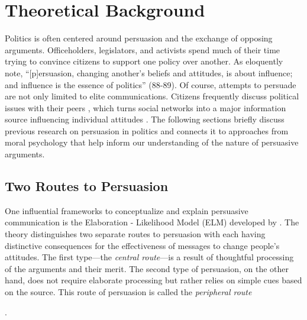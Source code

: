 


\section{Theoretical Background}

Politics is often centered around persuasion and the exchange of opposing arguments. Officeholders, legislators, and activists spend much of their time trying to convince citizens to support one policy over another. As \citet{cobb1997changing} eloquently note, ``[p]ersuasion, changing another's beliefs and attitudes, is about influence; and influence is the essence of politics'' (88-89). Of course, attempts to persuade are not only limited to elite communications. Citizens frequently discuss political issues with their peers \citep{huckfeldt1995political}, which turns social networks into a major information source influencing individual attitudes \citep[e.g.,][]{ahn2010communication,lazer2010coevolution}. The following sections briefly discuss previous research on persuasion in politics and connects it to approaches from moral psychology that help inform our understanding of the nature of persuasive arguments.



\subsection{Two Routes to Persuasion}

One influential frameworks to conceptualize and explain persuasive communication is the Elaboration - Likelihood Model (ELM) developed by \citet{petty1986communication,petty1986elaboration}. The theory distinguishes two separate routes to persuasion with each having distinctive consequences for the effectiveness of messages to change people's attitudes. The first type---the \textit{central route}---is a result of thoughtful processing of the arguments and their merit. The second type of persuasion, on the other hand, does not require elaborate processing but rather relies on simple cues based on the source. This route of persuasion is called the \textit{peripheral route}

\citep[see also][for a similar distinction between systematic and heuristic processing]{chaiken1989heuristic}.




